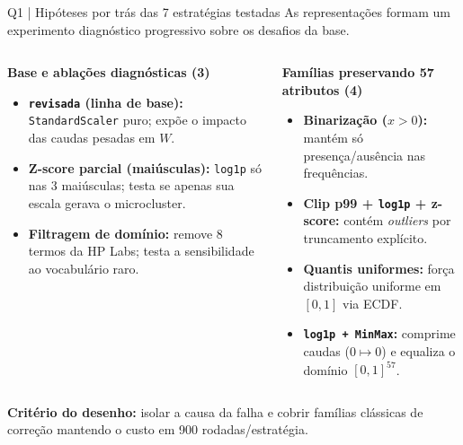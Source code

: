 \documentclass[aspectratio=169,11pt]{beamer}
\begin{document}
\begin{frame}[t]{Q1 | Hipóteses por trás das 7 estratégias testadas}
\small\color{cinzaescuro}As representações formam um experimento diagnóstico progressivo sobre os desafios da base.
\vspace{1mm}
\begin{columns}[T,onlytextwidth]
\begin{simplebox}
\footnotesize\textbf{\color{cinazul}Base e ablações diagnósticas (3)}\par\vspace{0.8mm}
\scriptsize
\begin{itemize}\setlength\itemsep{1.1mm}
\item \textbf{\texttt{revisada} (linha de base):} \texttt{StandardScaler} puro; expõe o impacto das caudas pesadas em $W$.
\item \textbf{Z-score parcial (maiúsculas):} \texttt{log1p} só nas 3 maiúsculas; testa se apenas sua escala gerava o microcluster.
\item \textbf{Filtragem de domínio:} remove 8 termos da HP Labs; testa a sensibilidade ao vocabulário raro.
\end{itemize}
\end{simplebox}
\begin{simplebox}
\footnotesize\textbf{\color{verdeescuro}Famílias preservando 57 atributos (4)}\par\vspace{0.8mm}
\scriptsize
\begin{itemize}\setlength\itemsep{0.9mm}
\item \textbf{Binarização ($x>0$):} mantém só presença/ausência nas frequências.
\item \textbf{Clip p99 + \texttt{log1p} + z-score:} contém \emph{outliers} por truncamento explícito.
\item \textbf{Quantis uniformes:} força distribuição uniforme em $[0,1]$ via ECDF.
\item \textbf{\texttt{log1p + MinMax}:} comprime caudas ($0 \mapsto 0$) e equaliza o domínio $[0,1]^{57}$.
\end{itemize}
\end{simplebox}
\end{columns}
\vspace{1mm}
\begin{notabox}\scriptsize \textbf{Critério do desenho:} isolar a causa da falha e cobrir famílias clássicas de correção mantendo o custo em 900 rodadas/estratégia.\end{notabox}
\end{frame}
\end{document}
